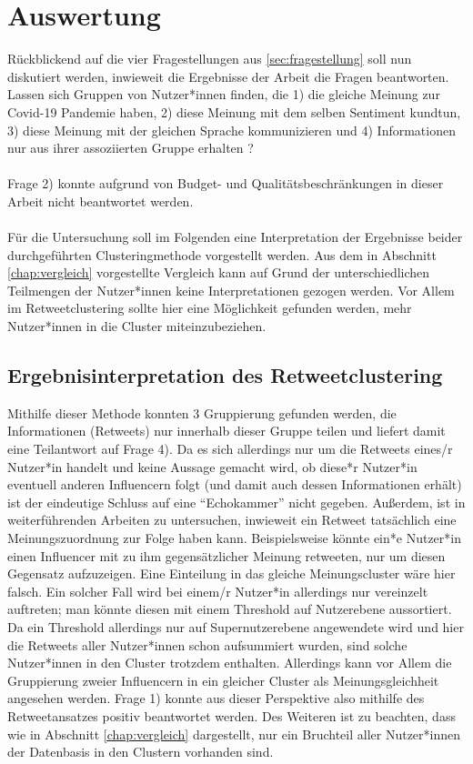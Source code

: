 \chapter{Auswertung}
\label{chap:auswertung}
Rückblickend auf die vier Fragestellungen aus \ref{sec:fragestellung} soll nun diskutiert werden, inwieweit die Ergebnisse der Arbeit die Fragen beantworten. 
Lassen sich Gruppen von Nutzer*innen finden, die 1) die gleiche Meinung zur Covid-19 Pandemie haben, 2) diese Meinung mit dem selben Sentiment kundtun, 3) diese Meinung mit der gleichen Sprache kommunizieren und 4) Informationen nur aus ihrer assoziierten Gruppe erhalten ? \\\\
Frage 2) konnte aufgrund von Budget- und Qualitätsbeschränkungen in dieser Arbeit nicht beantwortet werden.\\\\
Für die Untersuchung soll im Folgenden eine Interpretation der Ergebnisse beider durchgeführten Clusteringmethode vorgestellt werden.
Aus dem in Abschnitt \ref{chap:vergleich}  vorgestellte Vergleich kann auf Grund der unterschiedlichen Teilmengen der Nutzer*innen keine Interpretationen gezogen werden. Vor Allem im Retweetclustering sollte hier eine Möglichkeit gefunden werden, mehr Nutzer*innen in die Cluster miteinzubeziehen.
\section{Ergebnisinterpretation des Retweetclustering}
\label{sec:ergebnis-retweet}
Mithilfe dieser Methode konnten 3 Gruppierung gefunden  werden, die Informationen (Retweets) nur innerhalb dieser Gruppe teilen und liefert damit eine Teilantwort auf Frage 4). Da es sich allerdings nur um die Retweets eines/r Nutzer*in handelt  und keine Aussage gemacht wird, ob diese*r Nutzer*in eventuell anderen Influencern folgt (und damit auch dessen Informationen erhält) ist der eindeutige Schluss auf eine "`Echokammer"' nicht gegeben.
Außerdem, ist in weiterführenden Arbeiten zu untersuchen, inwieweit ein Retweet tatsächlich eine Meinungszuordnung zur Folge haben kann.
Beispielsweise könnte ein*e Nutzer*in einen Influencer mit zu ihm gegensätzlicher Meinung retweeten, nur um diesen Gegensatz aufzuzeigen. Eine Einteilung in das gleiche Meinungscluster wäre hier falsch.
Ein solcher Fall wird bei einem/r Nutzer*in allerdings nur vereinzelt auftreten; man könnte diesen mit einem Threshold auf Nutzerebene aussortiert. Da ein Threshold allerdings nur auf Supernutzerebene angewendete wird und hier die Retweets aller Nutzer*innen schon aufsummiert wurden, sind solche Nutzer*innen in den Cluster trotzdem enthalten. 
Allerdings kann vor Allem die Gruppierung zweier Influencern in ein gleicher Cluster als Meinungsgleichheit angesehen werden. Frage 1) konnte aus dieser Perspektive also mithilfe des Retweetansatzes positiv beantwortet werden.
Des Weiteren ist zu beachten, dass wie in Abschnitt \ref{chap:vergleich} dargestellt, nur ein Bruchteil aller Nutzer*innen der Datenbasis in den Clustern vorhanden sind.
